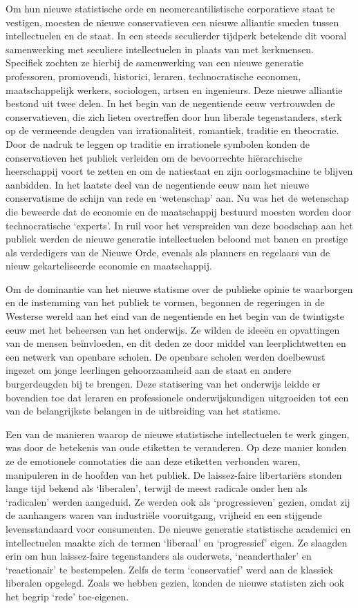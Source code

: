 \documentclass[
  a5paper,
  smalldemyvopaper,10pt,twoside,onecolumn,openright,extrafontsizes,hidelinks]{memoir}
\begin{document}
Om hun nieuwe statistische orde en neomercantilistische corporatieve
staat te vestigen, moesten de nieuwe conservatieven een nieuwe alliantie
smeden tussen intellectuelen en de staat. In een steeds seculierder
tijdperk betekende dit vooral samenwerking met seculiere intellectuelen
in plaats van met kerkmensen. Specifiek zochten ze hierbij de
samenwerking van een nieuwe generatie professoren, promovendi,
historici, leraren, technocratische economen, maatschappelijk werkers,
sociologen, artsen en ingenieurs. Deze nieuwe alliantie bestond uit twee
delen. In het begin van de negentiende eeuw vertrouwden de
conservatieven, die zich lieten overtreffen door hun liberale
tegenstanders, sterk op de vermeende deugden van irrationaliteit,
romantiek, traditie en theocratie. Door de nadruk te leggen op traditie
en irrationele symbolen konden de conservatieven het publiek verleiden
om de bevoorrechte hiërarchische heerschappij voort te zetten en om de
natiestaat en zijn oorlogsmachine te blijven aanbidden. In het laatste
deel van de negentiende eeuw nam het nieuwe conservatisme de schijn van
rede en `wetenschap' aan. Nu was het de wetenschap die beweerde dat de
economie en de maatschappij bestuurd moesten worden door technocratische
`experts'. In ruil voor het verspreiden van deze boodschap aan het
publiek werden de nieuwe generatie intellectuelen beloond met banen en
prestige als verdedigers van de Nieuwe Orde, evenals als planners en
regelaars van de nieuw gekarteliseerde economie en maatschappij.

Om de dominantie van het nieuwe statisme over de publieke opinie te
waarborgen en de instemming van het publiek te vormen, begonnen de
regeringen in de Westerse wereld aan het eind van de negentiende en het
begin van de twintigste eeuw met het beheersen van het onderwijs. Ze
wilden de ideeën en opvattingen van de mensen beïnvloeden, en dit deden
ze door middel van leerplichtwetten en een netwerk van openbare scholen.
De openbare scholen werden doelbewust ingezet om jonge leerlingen
gehoorzaamheid aan de staat en andere burgerdeugden bij te brengen. Deze
statisering van het onderwijs leidde er bovendien toe dat leraren en
professionele onderwijskundigen uitgroeiden tot een van de belangrijkste
belangen in de uitbreiding van het statisme.

Een van de manieren waarop de nieuwe statistische intellectuelen te werk
gingen, was door de betekenis van oude etiketten te veranderen. Op deze
manier konden ze de emotionele connotaties die aan deze etiketten
verbonden waren, manipuleren in de hoofden van het publiek. De
laissez-faire libertariërs stonden lange tijd bekend als `liberalen',
terwijl de meest radicale onder hen als `radicalen' werden aangeduid. Ze
werden ook als `progressieven' gezien, omdat zij de aanhangers waren van
industriële vooruitgang, vrijheid en een stijgende levensstandaard voor
consumenten. De nieuwe generatie statistische academici en
intellectuelen maakte zich de termen `liberaal' en `progressief' eigen.
Ze slaagden erin om hun laissez-faire tegenstanders als ouderwets,
`neanderthaler' en `reactionair' te bestempelen. Zelfs de term
`conservatief' werd aan de klassiek liberalen opgelegd. Zoals we hebben
gezien, konden de nieuwe statisten zich ook het begrip `rede'
toe-eigenen.
\end{document}
